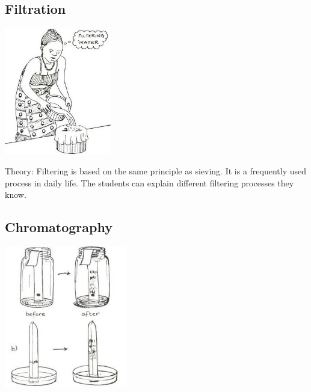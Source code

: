 \begin{multicols}{2}
\columnbreak

\subsection{Filtration}

\begin{center}
\includegraphics[width=0.35\textwidth]{./img/source/filtering-2.jpg}
\end{center}

\begin{description*}
\item[Theory:]{Filtering is based on the same principle as
sieving. It is a frequently used process in daily
life. The students can explain different filtering
processes they know.}
\end{description*}

\subsection{Chromatography} %

\begin{center}
\includegraphics[width=0.4\textwidth]{./img/source/chromatography-2.jpg} 
\end{center}


\end{multicols}
